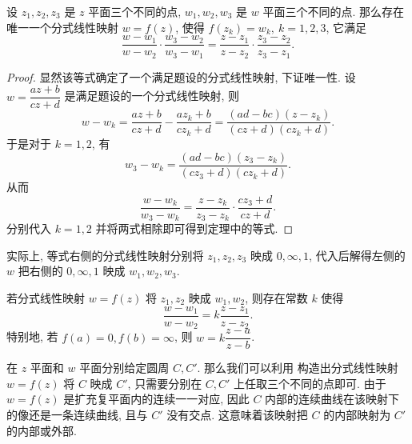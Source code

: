 \begin{theorem}
  \label{thm:three-points-determine-fractal-transform}
  设 $z_1,z_2,z_3$ 是 $z$ 平面三个不同的点, $w_1,w_2,w_3$ 是 $w$ 平面三个不同的点.
  那么存在唯一一个分式线性映射 $w=f(z)$, 使得 $f(z_k)=w_k,\ k=1,2,3$, 它满足
  \[
     \frac{w-w_1}{w-w_2}\cdot\frac{w_3-w_2}{w_3-w_1}
    =\frac{z-z_1}{z-z_2}\cdot\frac{z_3-z_2}{z_3-z_1}.
  \]
\end{theorem}

\begin{proof}
  显然该等式确定了一个满足题设的分式线性映射, 下证唯一性.
  设 $w=\dfrac{az+b}{cz+d}$ 是满足题设的一个分式线性映射, 则
  \[
     w-w_k
    =\frac{az+b}{cz+d}-\frac{az_k+b}{cz_k+d}
    =\frac{(ad-bc)(z-z_k)}{(cz+d)(cz_k+d)}.
  \]
  于是对于 $k=1,2$, 有
  \[
    w_3-w_k=\frac{(ad-bc)(z_3-z_k)}{(cz_3+d)(cz_k+d)}.
  \]
  从而
  \[
    \frac{w-w_k}{w_3-w_k}
   =\frac{z-z_k}{z_3-z_k}\cdot\frac{cz_3+d}{cz+d}.
  \]
  分别代入 $k=1,2$ 并将两式相除即可得到定理中的等式.
\end{proof}

实际上, 等式右侧的分式线性映射分别将 $z_1,z_2,z_3$ 映成 $0,\infty,1$, 代入后解得左侧的 $w$ 把右侧的 $0,\infty,1$ 映成 $w_1,w_2,w_3$.

\begin{corollary}
  若分式线性映射 $w=f(z)$ 将 $z_1,z_2$ 映成 $w_1,w_2$, 则存在常数 $k$ 使得
  \[
    \frac{w-w_1}{w-w_2}=k\frac{z-z_1}{z-z_2}.
  \]
  特别地, 若 $f(a)=0,f(b)=\infty$, 则 $w=k\dfrac{z-a}{z-b}$.
\end{corollary}

在 $z$ 平面和 $w$ 平面分别给定圆周 $C,C'$.
那么我们可以利用 构造出分式线性映射 $w=f(z)$ 将 $C$ 映成 $C'$, 只需要分别在 $C,C'$ 上任取三个不同的点即可.
由于 $w=f(z)$ 是扩充复平面内的连续一一对应, 因此 $C$ 内部的连续曲线在该映射下的像还是一条连续曲线, 且与 $C'$ 没有交点.
这意味着该映射把 $C$ 的内部映射为 $C'$ 的内部或外部.

